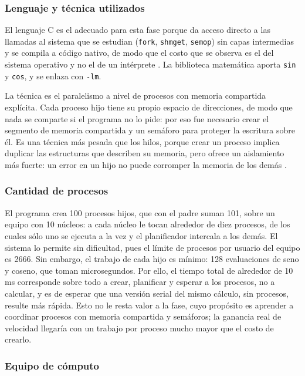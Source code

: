 \subsubsection{Lenguaje y técnica utilizados}
\label{sec:cap03:aaron:tecnica}

El lenguaje C es el adecuado para esta fase porque da acceso directo a las llamadas al sistema que se estudian (\texttt{fork}, \texttt{shmget}, \texttt{semop}) sin capas intermedias y se compila a código nativo, de modo que el costo que se observa es el del sistema operativo y no el de un intérprete \cite{kerrisk:linux-programming-interface:2010}. La biblioteca matemática aporta \texttt{sin} y \texttt{cos}, y se enlaza con \texttt{-lm}.

La técnica es el paralelismo a nivel de procesos con memoria compartida explícita. Cada proceso hijo tiene su propio espacio de direcciones, de modo que nada se comparte si el programa no lo pide: por eso fue necesario crear el segmento de memoria compartida y un semáforo para proteger la escritura sobre él. Es una técnica más pesada que los hilos, porque crear un proceso implica duplicar las estructuras que describen su memoria, pero ofrece un aislamiento más fuerte: un error en un hijo no puede corromper la memoria de los demás \cite{tanenbaum:modern-os:2014}.

\subsubsection{Cantidad de procesos}
\label{sec:cap03:aaron:procesos}

El programa crea 100 procesos hijos, que con el padre suman 101, sobre un equipo con 10 núcleos: a cada núcleo le tocan alrededor de diez procesos, de los cuales sólo uno se ejecuta a la vez y el planificador intercala a los demás. El sistema lo permite sin dificultad, pues el límite de procesos por usuario del equipo es 2666. Sin embargo, el trabajo de cada hijo es mínimo: 128 evaluaciones de seno y coseno, que toman microsegundos. Por ello, el tiempo total de alrededor de 10 ms corresponde sobre todo a crear, planificar y esperar a los procesos, no a calcular, y es de esperar que una versión serial del mismo cálculo, sin procesos, resulte más rápida. Esto no le resta valor a la fase, cuyo propósito es aprender a coordinar procesos con memoria compartida y semáforos; la ganancia real de velocidad llegaría con un trabajo por proceso mucho mayor que el costo de crearlo.

\subsubsection{Equipo de cómputo}
\label{sec:cap03:aaron:equipo}

